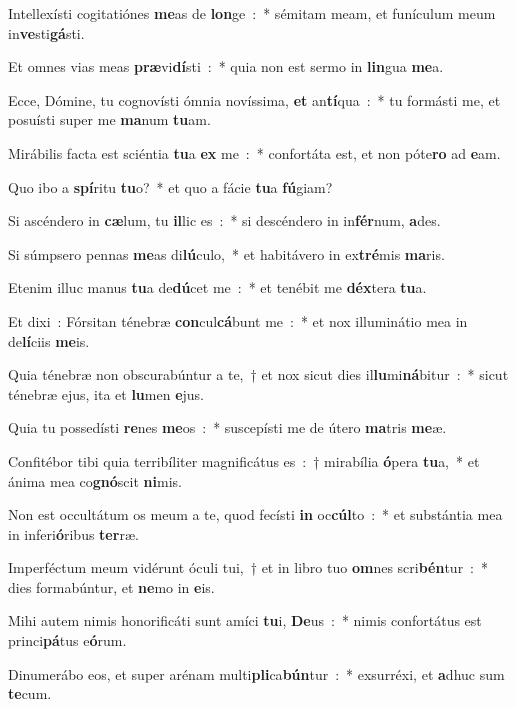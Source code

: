 ﻿\item Intellexísti cogitatiónes \textbf{me}\-as de \textbf{lon}\-ge~:~* sémitam meam, et funículum meum in\textbf{ve}sti\textbf{gá}sti.
\item Et omnes vias meas \textbf{præ}\-vi\textbf{dí}\-sti~:~* quia non est sermo in \textbf{lin}\-gua \textbf{me}a.
\item Ecce, Dómine, tu cognovísti ómnia novíssima, \textbf{et} an\textbf{tí}\-qua~:~* tu formásti me, et posuísti super me \textbf{ma}\-num \textbf{tu}am.
\item Mirábilis facta est sciéntia \textbf{tu}a \textbf{ex} me~:~* confortáta est, et non póte\textbf{ro} ad \textbf{e}am.
\item Quo ibo a \textbf{spí}\-ritu \textbf{tu}o?~* et quo a fácie \textbf{tu}a \textbf{fú}giam?
\item Si ascéndero in \textbf{cæ}\-lum, tu \textbf{il}\-lic es~:~* si descéndero in in\textbf{fér}\-num, \textbf{a}des.
\item Si súmpsero pennas \textbf{me}\-as di\textbf{lú}\-culo,~* et habitávero in ex\textbf{tré}\-mis \textbf{ma}ris.
\item Etenim illuc manus \textbf{tu}a de\textbf{dú}\-cet me~:~* et tenébit me \textbf{déx}\-tera \textbf{tu}a.
\item Et dixi~: Fórsitan ténebræ \textbf{con}\-cul\textbf{cá}\-bunt me~:~* et nox illuminátio mea in de\textbf{lí}\-ciis \textbf{me}is.
\item Quia ténebræ non obscurabúntur a te,~† et nox sicut dies il\textbf{lu}\-mi\textbf{ná}\-bitur~:~* sicut ténebræ ejus, ita et \textbf{lu}\-men \textbf{e}jus.
\item Quia tu possedísti \textbf{re}\-nes \textbf{me}\-os~:~* suscepísti me de útero \textbf{ma}\-tris \textbf{me}æ.
\item Confitébor tibi quia terribíliter magnificátus es~:~† mirabília \textbf{ó}\-pera \textbf{tu}a,~* et ánima mea co\textbf{gnó}\-scit \textbf{ni}mis.
\item Non est occultátum os meum a te, quod fecísti \textbf{in} oc\textbf{cúl}\-to~:~* et substántia mea in inferi\textbf{ó}\-ribus \textbf{ter}ræ.
\item Imperféctum meum vidérunt óculi tui,~† et in libro tuo \textbf{om}\-nes scri\textbf{bén}\-tur~:~* dies formabúntur, et \textbf{ne}\-mo in \textbf{e}is.
\item Mihi autem nimis honorificáti sunt amíci \textbf{tu}\-i, \textbf{De}\-us~:~* nimis confortátus est princi\textbf{pá}\-tus e\textbf{ó}rum.
\item Dinumerábo eos, et super arénam mul\-ti\-\textbf{pli}\-ca\-\textbf{bún}\-tur~:~* exsurréxi, et \textbf{a}\-dhuc sum \textbf{te}cum.

